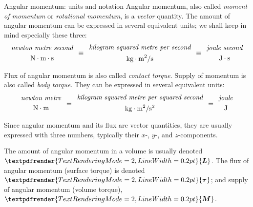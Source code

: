 \documentclass[a4paper,12pt,%
onecolumn,oneside,%
british%
]{memoir}
\renewcommand*{\bm}[1]{\textpdfrender{TextRenderingMode=2,LineWidth=0.2pt}{\boldsymbol{#1}}}
\renewcommand*{\|}[1][]{\nonscript\:#1\vert\nonscript\:\mathopen{}}
\newcommand*{\yL}{\bm{L}}%
\newcommand*{\yto}{\bm{\tau}}%
\newcommand*{\yM}{\bm{M}}%
\begin{document}
\begin{definition}{Angular momentum: units and notation}
  Angular momentum, also called \emph{moment of momentum} or \emph{rotational momentum}, is a \emph{vector} quantity. The amount of angular momentum can be expressed in several equivalent units; we shall keep in mind especially these three:
  \begin{equation*}
    \begin{gathered}
      \textit{newton metre second}\\
      \unit{N\cdot m \cdot s}
    \end{gathered}
\enskip\equiv\enskip
    \begin{gathered}
      \textit{kilogram squared metre per second}\\
      \unit{kg\cdot m^{2}/s}
    \end{gathered}
\enskip\equiv\enskip
    \begin{gathered}
      \textit{joule second}\\
      \unit{J\cdot s}
    \end{gathered}
\end{equation*}

\smallskip

Flux of angular momentum is also called \emph{contact torque}. Supply of momentum is also called \emph{body torque}. They can be expressed in several equivalent units:
\begin{equation*}
    \begin{gathered}
      \textit{newton metre}\\
      \unit{N\cdot m}
    \end{gathered}
\enskip\equiv\enskip
    \begin{gathered}
      \textit{kilogram squared metre per squared second}\\
      \unit{kg\cdot m^{2}/s^{2}}
    \end{gathered}
\enskip\equiv\enskip
    \begin{gathered}
      \textit{joule}\\
      \unit{J}
    \end{gathered}
\end{equation*}

Since angular momentum and its flux are vector quantities, they are usually expressed with three numbers, typically their $x$-, $y$-, and $z$-components.

\smallskip

The amount of angular momentum in a volume is usually denoted $\yL$. The flux of angular momentum (surface torque) is denoted $\yto$; and supply of angular momentum (volume torque), $\yM$.
\end{definition}
\end{document}
